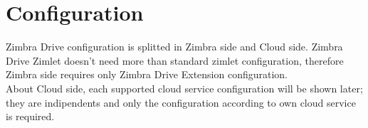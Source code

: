 \chapter{Configuration}\label{cha:configuration}

Zimbra Drive configuration is splitted in Zimbra side and Cloud side.
Zimbra Drive Zimlet doesn't need more than standard zimlet configuration,
therefore Zimbra side requires only Zimbra Drive Extension configuration.\\
About Cloud side, each supported cloud service configuration will be shown later;
they are indipendents and only the configuration according to own cloud service is required.



